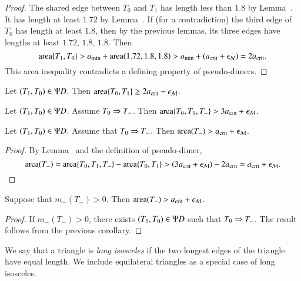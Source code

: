 \begin{proof}
  The shared edge between $T_0$ and $T_1$ has length less than $1.8$
  by Lemma~.  It has length at least $1.72$ by
  Lemma~.  If (for a contradiction) the third edge of
  $T_0$ has length at least $1.8$, then by the previous lemmas, its
  three edges have lengths at least $1.72$, $1.8$, $1.8$.  Then
\[
{\operatorname{area}}\{T_1,T_0\} > a_\text{min} + {\operatorname{area}}(1.72,1.8,1.8) > a_\text{min} + (a_\text{crit} + \epsilon_{\mathcal N}) = 2a_\text{crit}.
\]
This area inequality contradicts a defining property of pseudo-dimers.
\end{proof}

\begin{lemma}
Let $(T_1,T_0)\in\Psi D$.  Then ${\operatorname{area}}\{T_0,T_1\} \ge 2a_\text{crit} - \epsilon_{\mathcal M}$.
\end{lemma}

\begin{lemma}
Let $(T_1,T_0)\in\Psi D$. Assume $T_0\Rightarrow T_-$.  
Then ${\operatorname{area}}\{T_0,T_1,T_-\} > 3a_\text{crit} + \epsilon_{\mathcal M}$.
\end{lemma}

\begin{corollary} 
Let $(T_1,T_0)\in\Psi D$.  Assume that $T_0\Rightarrow T_-$.  Then
${\operatorname{area}}(T_-) > a_\text{crit}+\epsilon_{\mathcal M}$.
\end{corollary}

\begin{proof}  
  By Lemma~ and the definition of pseudo-dimer,
\[
{\operatorname{area}}(T_-) = {\operatorname{area}}\{T_0,T_1,T_-\} - {\operatorname{area}}\{T_0,T_1\} 
> (3a_\text{crit} + \epsilon_{\mathcal M}) - 2a_\text{crit} = a_\text{crit} + \epsilon_{\mathcal M}.
\]
\end{proof}

\begin{corollary}
  Suppose that $m_-(T_-)>0$.  Then ${\operatorname{area}}(T_-) > a_\text{crit} + \epsilon_{\mathcal M}$.
\end{corollary}

\begin{proof} 
  If $m_-(T_-)>0$, there exists $(T_1,T_0)\in\Psi D$ such that $T_0\Rightarrow
  T_-$.  The result follows from the previous corollary.
\end{proof}


\begin{definition}
  We say that a triangle is {\it long isosceles} if the two longest edges of
  the triangle have equal length.  We include equilateral triangles as
  a special case of long isosceles.
\end{definition}

